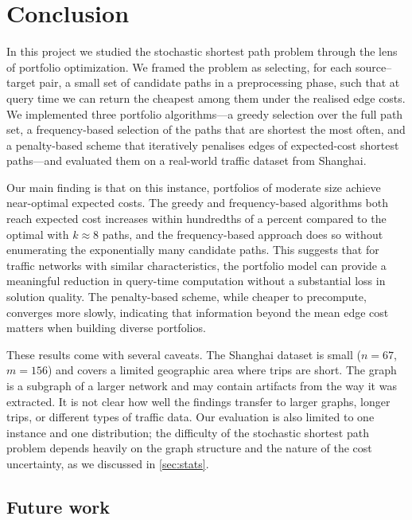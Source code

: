 \section{Conclusion}
\label{sec:conclusion}

In this project we studied the stochastic shortest path problem through the lens of portfolio optimization. We framed the problem as selecting, for each source--target pair, a small set of candidate paths in a preprocessing phase, such that at query time we can return the cheapest among them under the realised edge costs. We implemented three portfolio algorithms---a greedy selection over the full path set, a frequency-based selection of the paths that are shortest the most often, and a penalty-based scheme that iteratively penalises edges of expected-cost shortest paths---and evaluated them on a real-world traffic dataset from Shanghai.

Our main finding is that on this instance, portfolios of moderate size achieve near-optimal expected costs. The greedy and frequency-based algorithms both reach expected cost increases within hundredths of a percent compared to the optimal with $k \approx 8$ paths, and the frequency-based approach does so without enumerating the exponentially many candidate paths. This suggests that for traffic networks with similar characteristics, the portfolio model can provide a meaningful reduction in query-time computation without a substantial loss in solution quality. The penalty-based scheme, while cheaper to precompute, converges more slowly, indicating that information beyond the mean edge cost matters when building diverse portfolios.

These results come with several caveats. The Shanghai dataset is small ($n = 67$, $m = 156$) and covers a limited geographic area where trips are short. The graph is a subgraph of a larger network and may contain artifacts from the way it was extracted. It is not clear how well the findings transfer to larger graphs, longer trips, or different types of traffic data. Our evaluation is also limited to one instance and one distribution; the difficulty of the stochastic shortest path problem depends heavily on the graph structure and the nature of the cost uncertainty, as we discussed in \cref{sec:stats}.

\subsection{Future work}

